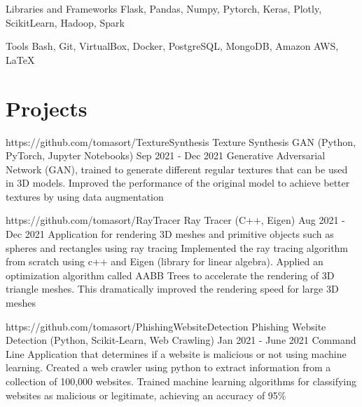 \documentclass[letterpaper,10pt]{article}
\begin{document}
  \skillItem
    {Libraries and Frameworks}
    {Flask, 
      Pandas, 
      Numpy, 
      Pytorch, 
      Keras, 
      Plotly, 
      ScikitLearn, 
      Hadoop, 
      Spark}

  \skillItem
    {Tools}
    {Bash, 
      Git, 
      VirtualBox, 
      Docker, 
      PostgreSQL, 
      MongoDB, 
      Amazon AWS, 
      \LaTeX\ }
  \vspace{3pt}
\sectionEnd

\section{Projects}
\sectionStart


  \projectHeading
    {https://github.com/tomasort/TextureSynthesis}
    {Texture Synthesis GAN}
    {(Python, PyTorch, Jupyter Notebooks)}
    {Sep 2021 - Dec 2021}
    {Generative Adversarial Network (GAN), trained to generate different regular textures that can be used in 3D models.}
  \listStart
    \bulletItem
      {Improved the performance of the original model to achieve better textures by using data augmentation }
  \listEnd


  \projectHeading
    {https://github.com/tomasort/RayTracer}
    {Ray Tracer}
    {(C++, Eigen)}
    {Aug 2021 - Dec 2021}
    {Application for rendering 3D meshes and primitive objects such as spheres and rectangles using ray tracing}
  \listStart
    \bulletItem
      {Implemented the ray tracing algorithm from scratch using c++ and Eigen (library for linear algebra).}
    \bulletItem
      {Applied an optimization algorithm called AABB Trees to accelerate the rendering of 3D triangle meshes. This dramatically improved the rendering speed for large 3D meshes }
  \listEnd

  \projectHeading
    {https://github.com/tomasort/PhishingWebsiteDetection}
    {Phishing Website Detection}
    {(Python, Scikit-Learn, Web Crawling)}
    {Jan 2021 - June 2021}
    {Command Line Application that determines if a website is malicious or not using machine learning.}
  \listStart
    \bulletItem
      {Created a web crawler using python to extract information from a collection of 100,000 websites. }
    \bulletItem
      {Trained machine learning algorithms for classifying websites as malicious or legitimate, achieving an accuracy of 95\%}
  \listEnd
\end{document}
